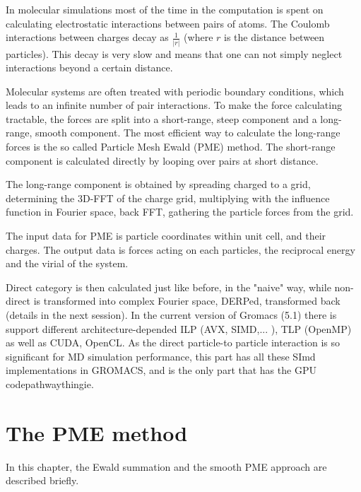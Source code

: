\documentclass[12pt,a4paper,notitlepage]{report}
\newcommand{\draft}[1]{#1}
\begin{document}
In molecular simulations most of the time in the computation is spent on calculating electrostatic interactions between pairs of atoms. The Coulomb interactions between charges decay as $\frac{1}{\lvert r \rvert}$ (where $r$ is the distance between particles). This decay is very slow and means that one can not simply neglect interactions beyond a certain distance.

 Molecular systems are often treated with periodic boundary conditions, which leads to an infinite number of pair interactions. To make the force calculating tractable, the forces are split into a short-range, steep component and a long-range, smooth component. The most efficient way to calculate the long-range forces is the so called Particle Mesh Ewald (PME) method. The short-range component is calculated directly by looping over pairs at short distance. 
 
The long-range component is obtained by spreading charged to a grid, determining the 3D-FFT of the charge grid, multiplying with the influence function in Fourier space, back FFT, gathering the particle forces from the grid. 




The input data for PME is particle coordinates within unit cell, and their charges.  The output data is forces acting on each particles, the reciprocal energy and the virial of the system.

 Direct category is then calculated just like before, in the "naive" way, while non-direct is transformed into complex Fourier space, DERPed, transformed back (details in the next session).
In the current version of Gromacs (5.1) there is support different architecture-depended ILP (AVX, SIMD,... ), TLP (OpenMP) as well as CUDA, OpenCL. As the direct particle-to particle interaction is so significant for MD simulation performance, this part has all these SImd implementations in GROMACS, and is the only part that has the GPU codepathwaythingie.
\fi

\newpage

\chapter{The PME method}
In this chapter, the Ewald summation and the smooth PME approach are described briefly.

\end{document}
